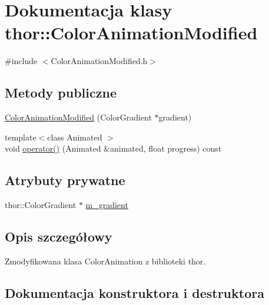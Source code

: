 \hypertarget{classthor_1_1_color_animation_modified}{}\section{Dokumentacja klasy thor\+:\+:Color\+Animation\+Modified}
\label{classthor_1_1_color_animation_modified}


{\ttfamily \#include $<$Color\+Animation\+Modified.\+h$>$}

\subsection*{Metody publiczne}
\begin{DoxyCompactItemize}
\item 
\mbox{\hyperlink{classthor_1_1_color_animation_modified_acc8f32187753112ecb01c053b0462356}{Color\+Animation\+Modified}} (Color\+Gradient $\ast$gradient)
\item 
{\footnotesize template$<$class Animated $>$ }\\void \mbox{\hyperlink{classthor_1_1_color_animation_modified_a1e37d889370f0e3f9686b9265cac2dba}{operator()}} (Animated \&animated, float progress) const
\end{DoxyCompactItemize}
\subsection*{Atrybuty prywatne}
\begin{DoxyCompactItemize}
\item 
thor\+::\+Color\+Gradient $\ast$ \mbox{\hyperlink{classthor_1_1_color_animation_modified_abf68739bcf2c9d31b3165a82e0e617c7}{m\+\_\+gradient}}
\end{DoxyCompactItemize}


\subsection{Opis szczegółowy}
Zmodyfikowana klasa Color\+Animation z biblioteki thor. 

\subsection{Dokumentacja konstruktora i destruktora}
\mbox{\label{classthor_1_1_color_animation_modified_acc8f32187753112ecb01c053b0462356}} 

